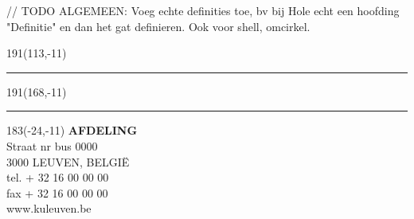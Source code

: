 \documentclass[12pt,a4paper,oneside]{book}
\begin{document}
// TODO ALGEMEEN: Voeg echte definities toe, bv bij Hole echt een hoofding "Definitie" en dan het gat definieren. Ook voor shell, omcirkel.

\newpage

\begin{appendices}

\end{appendices}

\newpage




\newpage

\thispagestyle{empty}
\sffamily
%
\begin{textblock}{191}(113,-11)
{\color{blueline}\rule{160pt}{5.5pt}}
\end{textblock}
%
\begin{textblock}{191}(168,-11)
{\color{blueline}\rule{5.5pt}{59pt}}
\end{textblock}
%
\begin{textblock}{183}(-24,-11)
\textblockcolour{}
\flushright
\fontsize{7}{7.5}\selectfont
\textbf{AFDELING}\\
Straat nr bus 0000\\
3000 LEUVEN, BELGI\"{E}\\
tel. + 32 16 00 00 00\\
fax + 32 16 00 00 00\\
www.kuleuven.be\\
\end{textblock}
%
\end{document}
